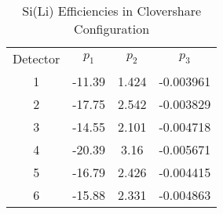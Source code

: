 \begin{table}[]
    \centering
    \caption{Si(Li) Efficiencies in Clovershare Configuration}
    \begin{tabular}{c|c|c|c}
    \toprule
        Detector & $p_1$ & $p_2$ & $p_3$ \\
        1	&	-11.39	&	1.424	&	-0.003961	\\
        2	&	-17.75	&	2.542	&	-0.003829	\\
        3	&	-14.55	&	2.101	&	-0.004718	\\
        4	&	-20.39	&	3.16	&	-0.005671	\\
        5	&	-16.79	&	2.426	&	-0.004415	\\
        6	&	-15.88	&	2.331	&	-0.004863	\\
        \bottomrule
    \end{tabular}
    \label{tab:sili_eff_clover}
\end{table}